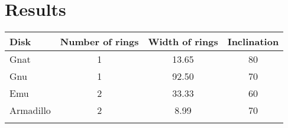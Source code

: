 \chapter{Results}

\begin{tabular}{lccc}
Disk      & Number of rings & Width of rings & Inclination \\
\hline
Gnat      & 1               & 13.65          & 80          \\
Gnu       & 1               & 92.50          & 70          \\
Emu       & 2               & 33.33          & 60          \\
Armadillo & 2               & 8.99           & 70          \\
\hline
\label{tab: param_study}
\end{tabular}
\\

